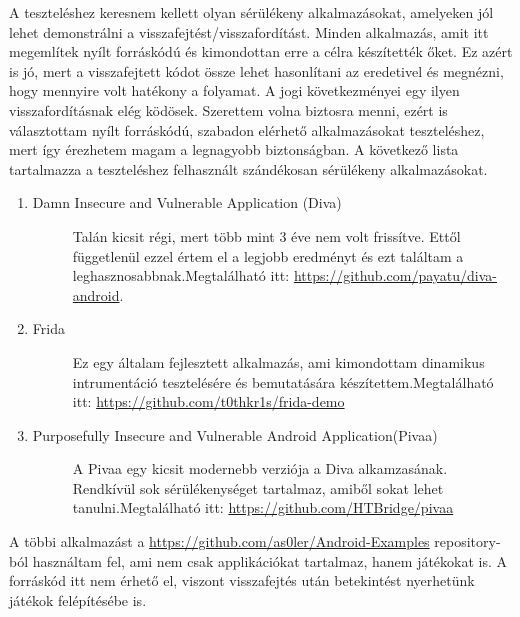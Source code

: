 \documentclass{thesis-ekf}
\theoremstyle{definition}
\theoremstyle{remark}
\begin{document}
A teszteléshez keresnem kellett olyan sérülékeny alkalmazásokat, amelyeken jól lehet demonstrálni a visszafejtést/visszafordítást.
Minden alkalmazás, amit itt megemlítek nyílt forráskódú és kimondottan erre a célra készítették őket.
Ez azért is jó, mert a visszafejtett kódot össze lehet hasonlítani az eredetivel és megnézni, hogy mennyire volt hatékony a folyamat.
A jogi következményei egy ilyen visszafordításnak elég ködösek.
Szerettem volna biztosra menni, ezért is választottam nyílt forráskódú, szabadon elérhető alkalmazásokat teszteléshez, mert így érezhetem magam a legnagyobb biztonságban.
A következő lista tartalmazza a teszteléshez felhasznált szándékosan sérülékeny alkalmazásokat.

\begin{enumerate}
	\item
	\begin{description}
		\item[Damn Insecure and Vulnerable Application (Diva)] Talán kicsit régi, mert több mint 3 éve nem volt frissítve. Ettől függetlenül ezzel értem el a legjobb eredményt és ezt találtam a leghasznosabbnak.\newline  Megtalálható itt: \url{https://github.com/payatu/diva-android}.
	\end{description}
	\item
	\begin{description}
		\item [Frida] Ez egy általam fejlesztett alkalmazás, ami kimondottam dinamikus intrumentáció tesztelésére és bemutatására készítettem.\newline Megtalálható itt: \url{https://github.com/t0thkr1s/frida-demo}
	\end{description}
	\item
	\begin{description}
		\item [Purposefully Insecure and Vulnerable Android Application(Pivaa)] A Pivaa egy kicsit modernebb verziója a Diva alkamzasának. Rendkívül sok sérülékenységet tartalmaz, amiből sokat lehet tanulni.\newline Megtalálható itt: \url{https://github.com/HTBridge/pivaa}
	\end{description}
\end{enumerate}

A többi alkalmazást a \url{https://github.com/as0ler/Android-Examples} repository-ból használtam fel, ami nem csak applikációkat tartalmaz, hanem játékokat is.
A forráskód itt nem érhető el, viszont visszafejtés után betekintést nyerhetünk játékok felépítésébe is.
\end{document}

